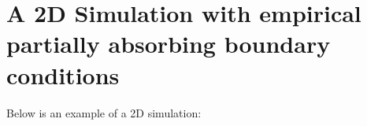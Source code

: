%

\section{A 2D Simulation with empirical partially absorbing boundary conditions}
Below is an example of a 2D simulation:



